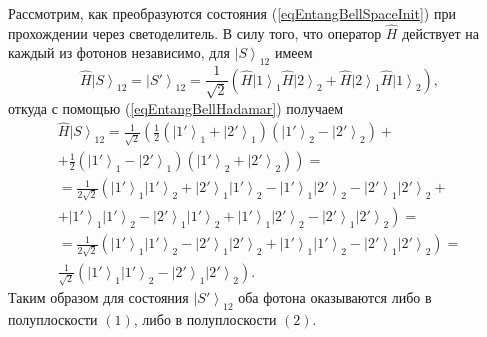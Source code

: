 


Рассмотрим, как преобразуются состояния (\ref{eqEntangBellSpaceInit})
при прохождении через светоделитель. В силу того, что оператор
$\hat{H}$ действует на каждый из фотонов независимо, для
$\left|S\right>_{12}$ имеем 
\begin{equation}
\hat{H}\left|S\right>_{12} = \left|S'\right>_{12} = 
\frac{1}{\sqrt{2}}
\left(
\hat{H}\left|1\right>_1\hat{H}\left|2\right>_2 +
\hat{H}\left|2\right>_1\hat{H}\left|1\right>_2
\right),
\nonumber 
\end{equation}
откуда с помощью (\ref{eqEntangBellHadamar}) получаем
\begin{eqnarray}
\hat{H}\left|S\right>_{12} =
\frac{1}{\sqrt{2}}
\left(
\frac{1}{2}
\left(\left|1'\right>_1 +
\left|2'\right>_1\right)
\left(\left|1'\right>_2 -
\left|2'\right>_2\right) +
\right.
\nonumber \\
+ \left.
\frac{1}{2}
\left(\left|1'\right>_1 -
\left|2'\right>_1\right)
\left(\left|1'\right>_2 +
\left|2'\right>_2\right)
\right) = 
\nonumber \\
=
\frac{1}{2 \sqrt{2}}
\left(
\left|1'\right>_1 \left|1'\right>_2 +
\left|2'\right>_1 \left|1'\right>_2 -
\left|1'\right>_1 \left|2'\right>_2 -
\left|2'\right>_1 \left|2'\right>_2 +
\right. 
\nonumber \\
+ \left.
\left|1'\right>_1 \left|1'\right>_2 -
\left|2'\right>_1 \left|1'\right>_2 +
\left|1'\right>_1 \left|2'\right>_2 -
\left|2'\right>_1 \left|2'\right>_2
\right) =
\nonumber \\
=
\frac{1}{2 \sqrt{2}}
\left(
\left|1'\right>_1 \left|1'\right>_2 
- \left|2'\right>_1 \left|2'\right>_2 
+ \left|1'\right>_1 \left|1'\right>_2 
- \left|2'\right>_1 \left|2'\right>_2
\right) = 
\nonumber \\
\frac{1}{\sqrt{2}}
\left(
\left|1'\right>_1 \left|1'\right>_2 
- \left|2'\right>_1 \left|2'\right>_2 
\right).
\nonumber
\end{eqnarray}
Таким образом для состояния $\left|S'\right>_{12}$ оба фотона оказываются
либо в полуплоскости $\left(1\right)$, либо в полуплоскости
$\left(2\right)$. 

